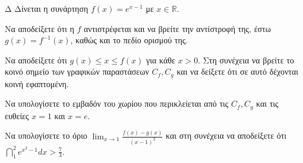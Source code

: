 \begin{thema}{Δ}
Δίνεται η συνάρτηση $f(x) = e^{x-1}$ με $x \in \mathbb{R}$.
\begin{erwthma}
    \item Να αποδείξετε ότι η $f$ αντιστρέφεται και να βρείτε την αντίστροφή της, έστω $g(x) = f^{-1}(x)$, καθώς και το πεδίο ορισμού της.
    \item Να αποδείξετε ότι $g(x) \le x \le f(x)$ για κάθε $x>0$. Στη συνέχεια να βρείτε το κοινό σημείο των γραφικών παραστάσεων $C_f, C_g$ και να δείξετε ότι σε αυτό δέχονται κοινή εφαπτομένη.
    \item Να υπολογίσετε το εμβαδόν του χωρίου που περικλείεται από τις $C_f, C_g$ και τις ευθείες $x=1$ και $x=e$.
    \item Να υπολογίσετε το όριο $\displaystyle \lim_{x\to 1} \frac{f(x) - g(x)}{(x-1)^2}$ και στη συνέχεια να αποδείξετε ότι $\displaystyle \dint_1^2 e^{x^2-1} dx > \frac{7}{3}$.
\end{erwthma}
\end{thema}
